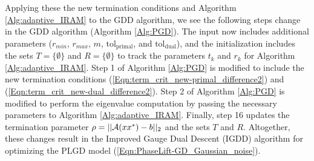 Applying these the new termination conditions and Algorithm \ref{Alg:adaptive_IRAM} to the GDD algorithm, we see the following steps change in the GDD algorithm (Algorithm \ref{Alg:PGD}).
The input now includes additional parameters ($r_{min}$, $r_{max}$, $m$, $\text{tol}_\text{primal}$, and $\text{tol}_\text{dual}$), and the initialization includes the sets $T = \{ \emptyset \}$ and $R = \{ \emptyset \}$ to track the parameters $t_k$ and $r_k$ for Algorithm \ref{Alg:adaptive_IRAM}.
Step 1 of Algorithm \ref{Alg:PGD} is modified to include the new termination conditions  (\ref{Eqn:term_crit_new-primal_difference2}) and (\ref{Eqn:term_crit_new-dual_difference2}).
Step 2 of Algorithm \ref{Alg:PGD} is modified to perform the eigenvalue computation by passing the necessary parameters to Algorithm \ref{Alg:adaptive_IRAM}.
Finally, step 16 updates the termination parameter $\rho = ||{\mathcal A}(xx^*) - b||_2$ and the sets $T$ and $R$.
Altogether, these changes result in the Improved Gauge Dual Descent (IGDD) algorithm for optimizing the PLGD model (\ref{Eqn:PhaseLift-GD_Gaussian_noise}).  

